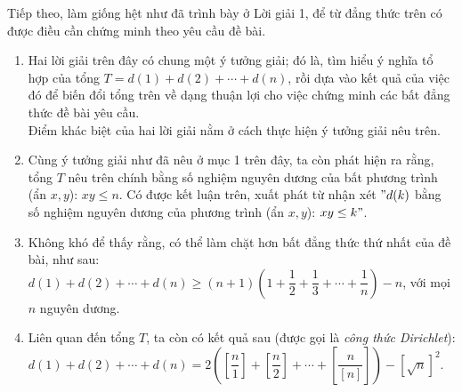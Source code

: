 \begin{bt}
{		Tiếp theo, làm giống hệt như đã trình bày ở Lời giải 1, để từ đẳng thức trên có được điều cần chứng minh theo yêu cầu đề bài.
		\begin{nx}
			\begin{enumerate}[1.]
				\item Hai lời giải trên đây có chung một ý tưởng giải; đó là, tìm hiểu ý nghĩa tổ hợp của tổng $ T=d(1)+d(2)+\cdots+d(n) $, rồi dựa vào kết quả của việc đó để biến đổi tổng trên về dạng thuận lợi cho việc chứng minh các bất đẳng thức đề bài yêu cầu.\\
				Điểm khác biệt của hai lời giải nằm ở cách thực hiện ý tưởng giải nêu trên.
				\item Cùng ý tưởng giải như đã nêu ở mục 1 trên đây, ta còn phát hiện ra rằng, tổng $ T $ nêu trên chính bằng số nghiệm nguyên dương của bất phương trình (ẩn $ x,y $): $ xy\le n $. Có được kết luận trên, xuất phát từ nhận xét $ "d(k) $ bằng số nghiệm nguyên dương của phương trình (ẩn $ x,y $): $ xy\le k "$. 
				\item Không khó để thấy rằng, có thể làm chặt hơn bất đẳng thức thứ nhất của đề bài, như sau: \\	$ d(1)+d(2)+\cdots+d(n) \ge (n+1) \left(1+\dfrac{1}{2}+\dfrac{1}{3}+\cdots+\dfrac{1}{n}\right) -n $, với mọi $ n $ nguyên dương.
				\item Liên quan đến tổng $ T $, ta còn có kết quả sau (được gọi là \textit{công thức Dirichlet}):\\
				$ d(1)+d(2)+\cdots+d(n) =2 \left(\left[\dfrac{n}{1}\right]+\left[\dfrac{n}{2}\right]+\cdots+\left[\dfrac{n}{\left[n\right]}\right]\right) -\left[\sqrt{n}\right]^2 $.
				
			\end{enumerate}
			
		\end{nx}
	}
\end{bt}
